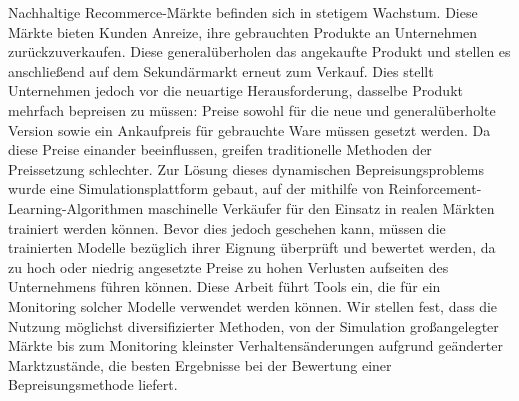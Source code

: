 Nachhaltige Recommerce-Märkte befinden sich in stetigem Wachstum. Diese Märkte bieten Kunden Anreize, ihre gebrauchten Produkte an Unternehmen zurückzuverkaufen. Diese generalüberholen das angekaufte Produkt und stellen es anschließend auf dem Sekundärmarkt erneut zum Verkauf. Dies stellt Unternehmen jedoch vor die neuartige Herausforderung, dasselbe Produkt mehrfach bepreisen zu müssen: Preise sowohl für die neue und generalüberholte Version sowie ein Ankaufpreis für gebrauchte Ware müssen gesetzt werden. Da diese Preise einander beeinflussen, greifen traditionelle Methoden der Preissetzung schlechter. Zur Lösung dieses dynamischen Bepreisungsproblems wurde eine Simulationsplattform gebaut, auf der mithilfe von Reinforcement-Learning-Algorithmen maschinelle Verkäufer für den Einsatz in realen Märkten trainiert werden können. Bevor dies jedoch geschehen kann, müssen die trainierten Modelle bezüglich ihrer Eignung überprüft und bewertet werden, da zu hoch oder niedrig angesetzte Preise zu hohen Verlusten aufseiten des Unternehmens führen können. Diese Arbeit führt Tools ein, die für ein Monitoring solcher Modelle verwendet werden können. Wir stellen fest, dass die Nutzung möglichst diversifizierter Methoden, von der Simulation großangelegter Märkte bis zum Monitoring kleinster Verhaltensänderungen aufgrund geänderter Marktzustände, die besten Ergebnisse bei der Bewertung einer Bepreisungsmethode liefert.